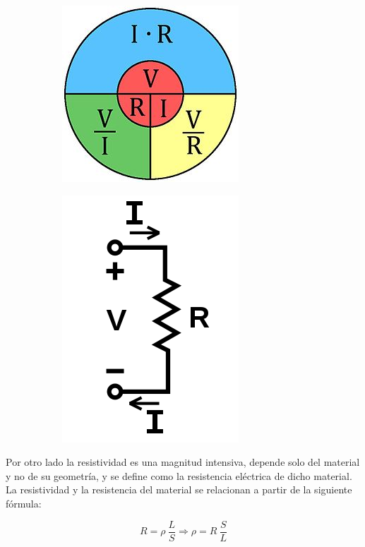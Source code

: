 \documentclass[a4paper,12pt,titlepage]{report}
\begin{document}
\begin{figure}[h!]
    \begin{subfigure}{0.5\textwidth}
        \centering
        \includegraphics[width=0.5\linewidth]{Images/Ley_de_ohm_-_Organigrama.jpg}
    \end{subfigure}
    \begin{subfigure}{0.42\textwidth}
        \centering
        \includegraphics[width=0.5\linewidth]{Images/esquema ohm.png}
    \end{subfigure}
\end{figure}

Por otro lado la resistividad es una magnitud intensiva, depende solo del material y no de su geometría, y se define como la resistencia eléctrica de dicho material. La resistividad y la resistencia del material se relacionan a partir de la siguiente fórmula:

\begin{equation}
    R = \rho \: \frac{L}{S} \Rightarrow \rho = R \: \frac{S}{L}
    \label{Resistividad}
\end{equation}
\end{document}
